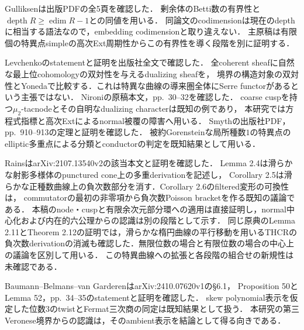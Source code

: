 \documentclass[11pt,a4paper]{ltjsarticle}
\begin{document}
\begin{description}[style=nextline]
\item[局所特異点と可換境界の認識に用いた既知結果]
Gulliksen\cite[Proposition 6, p.~300]{Gulliksen1967}は出版PDFの全5頁を確認した．
剰余体のBetti数の有界性と$\operatorname{depth}R\geq\operatorname{edim}R-1$との同値を用いる．
同論文のcodimensionは現在のdepthに相当する語法なので，embedding codimensionと取り違えない．
主原稿は有限個の特異点simpleの高次Ext周期性からこの有界性を導く段階を別に証明する．

Levchenko\cite[Proposition 2]{Levchenko}のstatementと証明を出版社全文で確認した．
全coherent sheafに自然な最上位cohomologyの双対性を与えるdualizing sheafを，
境界の構造対象の双対性とYonedaで比較する．これは特異な曲線の導来圏全体にSerre functorがあるという主張ではない．
Nironi\cite[Example 3.7, Theorem 3.8]{NironiDuality}の原稿本文，pp.~30--32を確認した．
coarse cuspを持つ$\mu_2$-tacnodeとその自明なdualizing characterは既知の例であり，
本研究では方程式指標と高次Extによるnormal被覆の障害へ用いる．
Smyth\cite[Appendix A, Proposition A.3]{SmythGenusOne}の出版社PDF，pp.~910--913の定理と証明を確認した．
被約Gorensteinな局所種数$1$の特異点のelliptic多重点による分類とconductorの判定を既知結果として用いる．

Rains\cite[Lemma 2.4, Corollaries 2.5--2.6]{RainsFiltered}はarXiv:2107.13540v2の該当本文と証明を確認した．
Lemma 2.4は滑らかな射影多様体のpunctured cone上の多重derivationを記述し，
Corollary 2.5は滑らかな正種数曲線上の負次数部分を消す．Corollary 2.6のfiltered変形の可換性は，
commutatorの最初の非零項から負次数Poisson bracketを作る既知の議論である．
本稿のnode・cuspと有限余次元部分環への適用は直接証明し，normal中心化および内在的六公理からの認識は別の段階として示す．
同じ原典のLemma 2.11とTheorem 2.12の証明では，滑らかな楕円曲線の平行移動を用いるTHCRの
負次数derivationの消滅も確認した．無限位数の場合と有限位数の場合の中心上の議論を区別して用いる．
この特異曲線への拡張と各段階の組合せの新規性は未確認である．

Baumann--Belmans--van Garderen\cite{BBvGCentral}はarXiv:2410.07620v1の\S6.1，
Proposition 50とLemma 52，pp.~34--35のstatementと証明を確認した．
skew polynomial表示を仮定した位数$3$のtwistとFermat三次商の同定は既知結果として扱う．
本研究の第三Veronese境界からの認識は，そのambient表示を結論として得る向きである．


\end{description}
\end{document}
